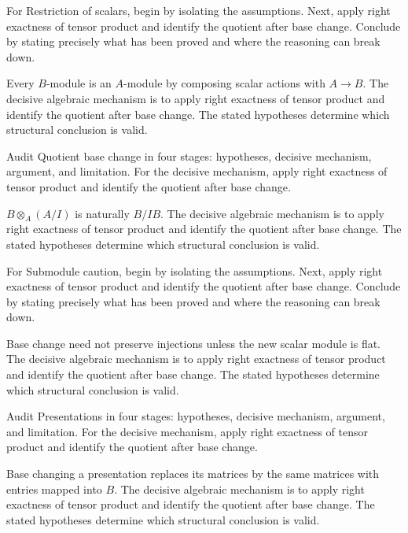 \begin{problem}\label{prob:v11-problem-02}
For Restriction of scalars, begin by isolating the assumptions. Next, apply right exactness of tensor product and identify the quotient after base change. Conclude by stating precisely what has been proved and where the reasoning can break down.
\end{problem}
\begin{solution}
Every $B$-module is an $A$-module by composing scalar actions with $A\to B$. The decisive algebraic mechanism is to apply right exactness of tensor product and identify the quotient after base change. The stated hypotheses determine which structural conclusion is valid.
\end{solution}

\begin{problem}\label{prob:v11-problem-03}
Audit Quotient base change in four stages: hypotheses, decisive mechanism, argument, and limitation. For the decisive mechanism, apply right exactness of tensor product and identify the quotient after base change.
\end{problem}
\begin{solution}
$B\otimes_A(A/I)$ is naturally $B/IB$. The decisive algebraic mechanism is to apply right exactness of tensor product and identify the quotient after base change. The stated hypotheses determine which structural conclusion is valid.
\end{solution}

\begin{problem}\label{prob:v11-problem-04}
For Submodule caution, begin by isolating the assumptions. Next, apply right exactness of tensor product and identify the quotient after base change. Conclude by stating precisely what has been proved and where the reasoning can break down.
\end{problem}
\begin{solution}
Base change need not preserve injections unless the new scalar module is flat. The decisive algebraic mechanism is to apply right exactness of tensor product and identify the quotient after base change. The stated hypotheses determine which structural conclusion is valid.
\end{solution}

\begin{problem}\label{prob:v11-problem-05}
Audit Presentations in four stages: hypotheses, decisive mechanism, argument, and limitation. For the decisive mechanism, apply right exactness of tensor product and identify the quotient after base change.
\end{problem}
\begin{solution}
Base changing a presentation replaces its matrices by the same matrices with entries mapped into $B$. The decisive algebraic mechanism is to apply right exactness of tensor product and identify the quotient after base change. The stated hypotheses determine which structural conclusion is valid.
\end{solution}

